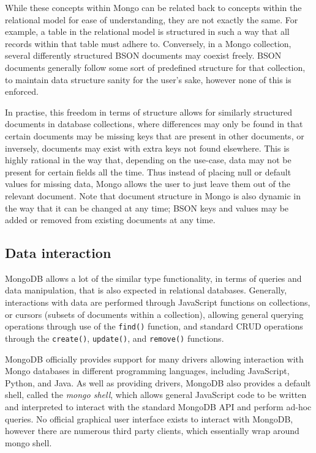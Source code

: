 \documentclass[a4paper,11pt]{article}
\begin{document}
While these concepts within Mongo can be related back to concepts within the relational model for ease of understanding,
they are not exactly the same. For example, a table in the relational model is structured in such a way that all records
within that table must adhere to. Conversely, in a Mongo collection, several differently structured BSON documents may
coexist freely. BSON documents generally follow some sort of predefined structure for that collection, to maintain
data structure sanity for the user's sake, however none of this is enforced.

In practise, this freedom in terms of structure allows for similarly structured documents in database collections, where
differences may only be found in that certain documents may be missing keys that are present in other documents, or inversely,
documents may exist with extra keys not found elsewhere. This is
highly rational in the way that, depending on the use-case, data may not be present for certain fields all the time.
Thus instead of placing null or default values for missing data, Mongo allows the user to just leave them out of the
relevant document. Note that document structure in Mongo is also dynamic in the way that it can be changed at any time;
BSON keys and values may be added or removed from existing documents at any time.



\subsection{Data interaction} %
\label{sub:data_interaction}

MongoDB allows a lot of the similar type functionality, in terms of queries and data manipulation, that is also expected in
relational databases. Generally, interactions with data are performed through JavaScript functions on collections, or cursors
(subsets of documents within a collection), allowing general querying operations through use of the \texttt{find()} function,
and standard CRUD operations through the \texttt{create()}, \texttt{update()}, and \texttt{remove()} functions.

MongoDB officially provides support for many drivers allowing interaction with Mongo databases in different programming
languages, including JavaScript, Python, and Java. As well as providing drivers, MongoDB also provides a default shell,
called the \textit{mongo shell}, which allows general JavaScript code to be written and interpreted to interact with the standard MongoDB
API and perform ad-hoc queries. No official graphical user interface exists to interact with MongoDB, however there
are numerous third party clients, which essentially wrap around mongo shell.
\end{document}
